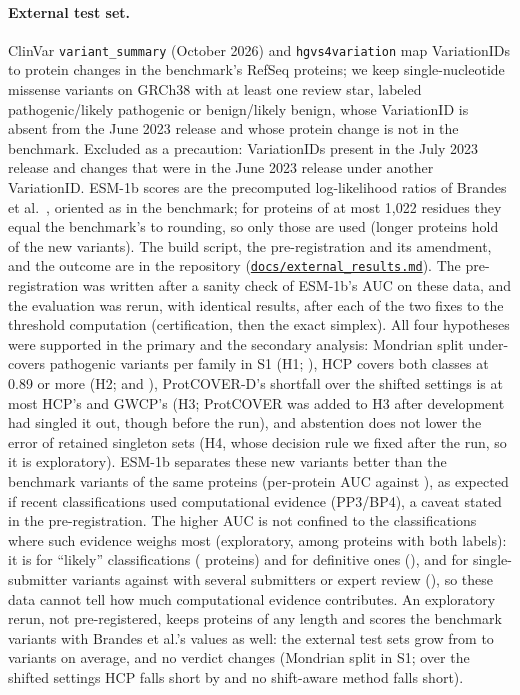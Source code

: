 \paragraph{External test set.} ClinVar \texttt{variant\_summary} (October 2026) and \texttt{hgvs4variation} map VariationIDs to protein changes in the benchmark's RefSeq proteins; we keep single-nucleotide missense variants on GRCh38 with at least one review star, labeled pathogenic/likely pathogenic or benign/likely benign, whose VariationID is absent from the June 2023 release and whose protein change is not in the benchmark. Excluded as a precaution: VariationIDs present in the July 2023 release and changes that were in the June 2023 release under another VariationID. ESM-1b scores are the precomputed log-likelihood ratios of Brandes et al.~\cite{brandes2023genome}, oriented as in the benchmark; for proteins of at most 1,022 residues they equal the benchmark's to rounding, so only those are used (longer proteins hold \extFracLong{} of the new variants). The build script, the pre-registration and its amendment, and the outcome are in the repository (\href{https://github.com/wael-fahmy/protcover/blob/main/docs/external_results.md}{\texttt{docs/external\_results.md}}). The pre-registration was written after a sanity check of ESM-1b's AUC on these data, and the evaluation was rerun, with identical results, after each of the two fixes to the threshold computation (certification, then the exact simplex). All four hypotheses were supported in the primary and the secondary analysis: Mondrian split under-covers pathogenic variants per family in S1 (H1; \extBtwoPath{} \extBtwoPathCI{}), HCP covers both classes at 0.89 or more (H2; \extHcpPath{} and \extHcpBenign{}), ProtCOVER-D's shortfall over the shifted settings is at most HCP's and GWCP's (H3; ProtCOVER was added to H3 after development had singled it out, though before the run), and abstention does not lower the error of retained singleton sets (H4, whose decision rule we fixed after the run, so it is exploratory). ESM-1b separates these new variants better than the benchmark variants of the same proteins (per-protein AUC \extAuc{} against \extAucBench{}), as expected if recent classifications used computational evidence (PP3/BP4), a caveat stated in the pre-registration. The higher AUC is not confined to the classifications where such evidence weighs most (exploratory, among proteins with both labels): it is \extAucLikely{} for ``likely'' classifications (\extNProtLikely{} proteins) and \extAucDefinitive{} for definitive ones (\extNProtDefinitive{}), and \extAucSingle{} for single-submitter variants against \extAucMulti{} with several submitters or expert review (\extNProtMulti{}), so these data cannot tell how much computational evidence contributes. An exploratory rerun, not pre-registered, keeps proteins of any length and scores the benchmark variants with Brandes et al.'s values as well: the external test sets grow from \extTestVar{} to \extAllTestVar{} variants on average, and no verdict changes (Mondrian split \extAllBtwoPath{} in S1; over the shifted settings HCP falls short by \extAllShortHcp{} and no shift-aware method falls short).

